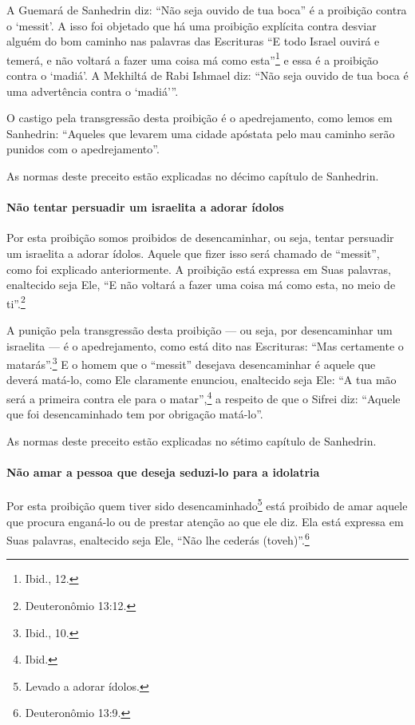 A Guemará de Sanhedrin diz: ``Não seja ouvido de tua boca'' é a
proibição contra o `messit'. A isso foi objetado que há uma proibição
explícita contra desviar alguém do bom caminho nas palavras das
Escrituras ``E todo Israel ouvirá e temerá, e não voltará a fazer uma
coisa má como esta''\footnote{Ibid., 12.} e essa é a proibição contra o `madiá'.
A Mekhiltá de Rabi Ishmael diz: ``Não seja ouvido de tua boca é uma
advertência contra o `madiá'''.

O castigo pela transgressão desta proibição é o apedrejamento, como
lemos em Sanhedrin: ``Aqueles que levarem uma cidade apóstata pelo mau
caminho serão punidos com o apedrejamento''.

As normas deste preceito estão explicadas no décimo capítulo de Sanhedrin.

\paragraph{Não tentar persuadir um israelita a adorar ídolos}

Por esta proibição somos proibidos de desencaminhar, ou seja, tentar
persuadir um israelita a adorar ídolos. Aquele que fizer isso será
chamado de ``messit'', como foi explicado anteriormente. A proibição
está expressa em Suas palavras, enaltecido seja Ele, ``E não voltará a
fazer uma coisa má como esta, no meio de ti''.\footnote{Deuteronômio 13:12.}

A punição pela transgressão desta proibição --- ou seja, por
desencaminhar um israelita --- é o apedrejamento, como está dito nas
Escrituras: ``Mas certamente o matarás''.\footnote{Ibid., 10.} E o homem que o
``messit'' desejava desencaminhar é aquele que deverá matá-lo, como Ele
claramente enunciou, enaltecido seja Ele: ``A tua mão será a primeira
contra ele para o matar'',\footnote{Ibid.} a respeito de que o Sifrei diz:
``Aquele que foi desencaminhado tem por obrigação matá-lo''.

As normas deste preceito estão explicadas no sétimo capítulo de Sanhedrin.

\paragraph{Não amar a pessoa que deseja seduzi-lo para a idolatria}

Por esta proibição quem tiver sido desencaminhado\footnote{Levado a adorar ídolos.} está proibido
de amar aquele que procura enganá-lo ou de prestar atenção ao que ele
diz. Ela está expressa em Suas palavras, enaltecido seja Ele, ``Não lhe
cederás (toveh)''.\footnote{Deuteronômio 13:9.}

